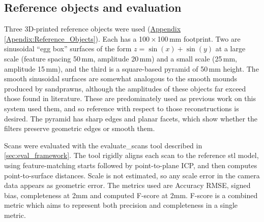 %

\subsection{Reference objects and evaluation}
\label{subsec:Reference_Objects}

Three 3D-printed reference objects were used (\hyperref[Apendix:Reference_Objects]{Appendix \ref*{Apendix:Reference_Objects}}). Each has a 100\,$\times$\,100\,mm footprint. Two are sinusoidal ``egg box'' surfaces of the form $z = \sin(x) + \sin(y)$ at a large scale (feature spacing 50\,mm, amplitude 20\,mm) and a small scale (25\,mm, amplitude 15\,mm), and the third is a square-based pyramid of 50\,mm height. The smooth sinusoidal surfaces are somewhat analogous to the smooth mounds produced by sandprawns, although the amplitudes of these objects far exceed those found in literature. These are predominately used as previous work on this system used them, and so reference with respect to those reconstructions is desired. The pyramid has sharp edges and planar facets, which show whether the filters preserve geometric edges or smooth them.

Scans were evaluated with the evaluate\_scans tool described in \autoref{sec:eval_framework}. The tool rigidly aligns each scan to the reference \gls{stl} model, using feature-matching starts followed by point-to-plane ICP, and then computes point-to-surface distances. Scale is not estimated, so any scale error in the camera data appears as geometric error. The metrics used are Accuracy RMSE, signed bias, completeness at 2mm and computed F-score at 2mm. F-score is a combined metric which aims to represent both precision and completeness in a single metric.

